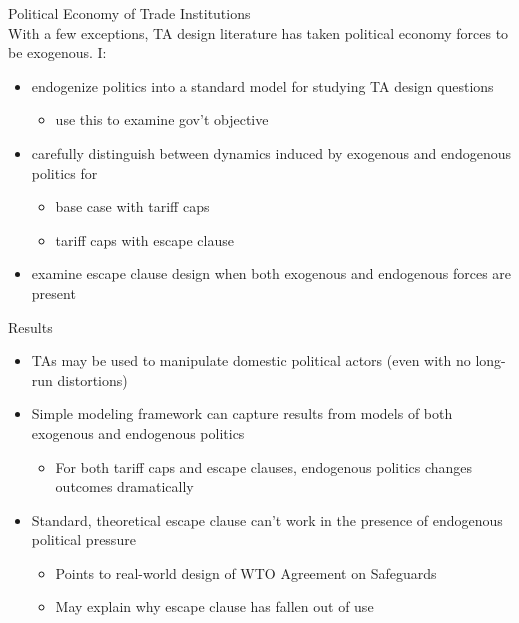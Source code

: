 \documentclass[12pt]{article}
\begin{document}

Political Economy of Trade Institutions\\

With a few exceptions, TA design literature has taken political economy forces to be exogenous. I:
\begin{itemize}
	\item endogenize politics into a standard model for studying TA design questions
		\begin{itemize}
			\item use this to examine gov't objective
		\end{itemize}
	\item carefully distinguish between dynamics induced by exogenous and endogenous politics for
		\begin{itemize}
			\item base case with tariff caps
			\item tariff caps with escape clause
		\end{itemize}
	\item examine escape clause design when both exogenous and endogenous forces are present
\end{itemize}




Results
\begin{itemize}
	\item TAs may be used to manipulate domestic political actors (even with no long-run distortions)
	\item Simple modeling framework can capture results from models of both exogenous and endogenous politics
		\begin{itemize}
			\item For both tariff caps and escape clauses, endogenous politics changes outcomes dramatically
		\end{itemize}
	\item Standard, theoretical escape clause can't work in the presence of endogenous political pressure
		\begin{itemize}
			\item Points to real-world design of WTO Agreement on Safeguards
			\item May explain why escape clause has fallen out of use
		\end{itemize}
\end{itemize}
\end{document}
